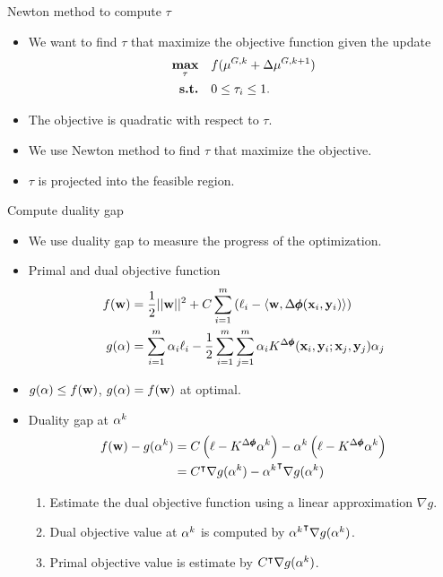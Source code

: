 \documentclass[first=dgreen,second=purple,logo=yellowexc]{aaltoslides}
\begin{document}
\begin{frame}{Newton method to compute $\tau$}
	\begin{itemize}\footnotesize
		\item We want to find $\tau$ that maximize the objective function given the update
		\begin{align*}
			\underset{\tau}{\textbf{max}} & \quad f(\mathbf {\mu}^{G,k} + \Delta{\mathbf {\mu}}^{G,k+1})\\
			\textbf{s.t.} & \quad 0\le\tau_i\le1.
		\end{align*}
		\item The objective is quadratic with respect to $\tau$.
		\item We use Newton method to find $\tau$ that maximize the objective.
		\item $\tau$ is projected into the feasible region.
	\end{itemize}
\end{frame}


\begin{frame}{Compute duality gap}
	\begin{itemize}\footnotesize
		\item We use duality gap to measure the progress of the optimization.
		\item Primal and dual objective function
		\begin{align*}\footnotesize
			f(\mathbf {w}) &= \frac{1}{2}||\mathbf {w}||^2 + C\sum_{i=1}^m\left(\ell_i-\langle \mathbf {w}, \Delta\pmb \phi(\mathbf {x}_i,\mathbf {y}_i) \rangle\right)\\
			g(\mathbf {\alpha}) &= \sum_{i=1}^m\alpha_i\ell_i - \frac{1}{2}\sum_{i=1}^m\sum_{j=1}^m\alpha_iK^{\Delta\pmb \phi}(\mathbf {x}_i,\mathbf {y}_i;\mathbf {x}_j,\mathbf {y}_j)\alpha_j
		\end{align*}
		\item $g(\mathbf {\alpha})\le f(\mathbf {w})$, $g(\mathbf {\alpha}) = f(\mathbf {w})$ at optimal.
		\item Duality gap at $\mathbf {\alpha}^k$
		\begin{align*}\footnotesize
			f(\mathbf {w}) - g(\mathbf {\alpha}^k) &= C\left(\mathbf {\ell}-K^{\Delta\pmb \phi}\mathbf {\alpha}^k\right) - \mathbf {\alpha}^k\left(\mathbf {\ell}-K^{\Delta\pmb \phi}\mathbf {\alpha}^k\right)\\
			&= C^{\intercal} \nabla g(\mathbf {\alpha}^k) -{\mathbf {\alpha}^k} ^{\intercal} \nabla g(\mathbf {\alpha}^k)
		\end{align*}
		\begin{enumerate}\footnotesize
			\item Estimate the dual objective function using a linear approximation $\nabla g$.
			\item Dual objective value at $\mathbf {\alpha}^k$ is computed by ${\mathbf {\alpha}^k} ^{\intercal} \nabla g(\mathbf {\alpha}^k)$.
			\item Primal objective value is estimate by $C^{\intercal} \nabla g(\mathbf {\alpha}^k)$.
		\end{enumerate}
	\end{itemize}
\end{frame}
\end{document}
